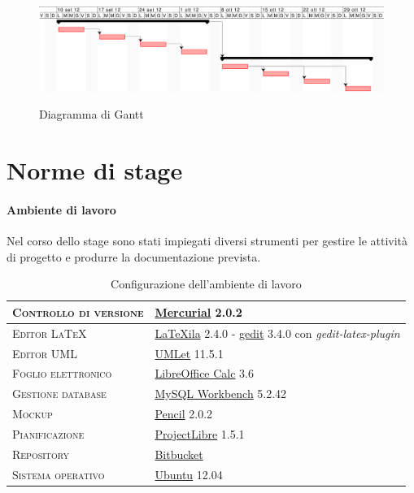 \begin{figure}[ht]
\begin{center}
\includegraphics[width=14.5cm]{gantt.png}
\label{fig:tesi:stage:gantt}
\caption{Diagramma di Gantt}
\end{center}
\end{figure}

\section{Norme di stage}

\paragraph{Ambiente di lavoro}
Nel corso dello stage sono stati impiegati diversi strumenti per gestire le attività di progetto e produrre la documentazione prevista.

\begin{table}[ht]
\centering
\begin{tabular}{|l|l|}
\hline
\textsc{Controllo di versione} & \underline{Mercurial} 2.0.2 \\ \hline
\textsc{Editor \LaTeX} & \underline{LaTeXila} 2.4.0 - \underline{gedit} 3.4.0 con \textit{gedit-latex-plugin} \\ \hline
\textsc{Editor UML} & \underline{UMLet} 11.5.1 \\ \hline
\textsc{Foglio elettronico} & \underline{LibreOffice Calc} 3.6 \\ \hline
\textsc{Gestione database} & \underline{MySQL Workbench} 5.2.42 \\ \hline
\textsc{Mockup} & \underline{Pencil} 2.0.2 \\	\hline
\textsc{Pianificazione} & \underline{ProjectLibre} 1.5.1 \\ \hline
\textsc{Repository} & \underline{Bitbucket} \\ \hline
\textsc{Sistema operativo} & \underline{Ubuntu} 12.04 \\ \hline
\end{tabular}
\caption{Configurazione dell'ambiente di lavoro}
\label{tab:tesi:stage:norme:strumenti}
\end{table}


